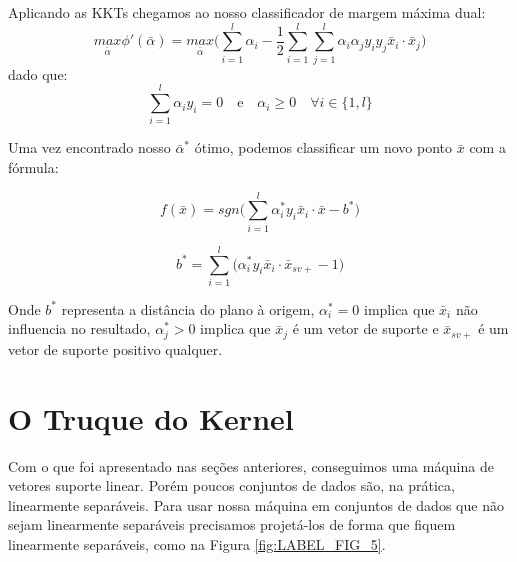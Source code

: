 Aplicando as KKTs chegamos ao nosso classificador de margem máxima dual:
\begin{equation}
    \underset{\bar{\alpha}}{max} \phi' (\bar{\alpha}) = \underset{\bar{\alpha}}{max} \Bigg( \sum_{i=1}^{l}\alpha_i - \frac{1}{2}\sum_{i=1}^{l}\sum_{j=1}^{l}\alpha_i \alpha_j y_i y_j \bar{x}_i\cdot \bar{x}_j \Bigg)
    \label{eq:EQ_Treinador_1}
\end{equation}
dado que:
\begin{equation}
    \sum_{i=1}^{l}\alpha_i y_i = 0 \quad \text{e} \quad \alpha_i \ge 0 \quad \forall  i \in \{1,l\}
    \label{eq:restricoes}
\end{equation}

Uma vez encontrado nosso $\bar{\alpha}^*$ ótimo, podemos classificar um novo ponto $\bar{x}$ com a fórmula:

\begin{equation}
    f(\bar{x}) = sgn\Bigg(
        \sum_{i=1}^{l} \alpha_i^*y_i\bar{x}_i\cdot\bar{x}
        -b^*
    \Bigg)
    \label{eq:EQ_Classificador_1}
\end{equation}

\begin{equation}
    b^* = \sum_{i=1}^{l} 
    \Bigg(
        \alpha_i^*y_i\bar{x}_i\cdot\bar{x}_{sv+} -1
    \Bigg)
    \label{eq:EQ_B_1}
\end{equation}

Onde $b^*$ representa a distância do plano à origem, $\alpha_i^*=0$ implica que $\bar{x}_i$ não influencia no resultado, $\alpha_j^*> 0$ implica que $\bar{x}_j$ é um vetor de suporte e $\bar{x}_{sv+}$ é um vetor de suporte positivo qualquer.


\section{O Truque do Kernel}
Com o que foi apresentado nas seções anteriores, conseguimos uma máquina de vetores suporte linear. Porém poucos conjuntos de dados são, na prática, linearmente separáveis. Para usar nossa máquina em conjuntos de dados que não sejam linearmente separáveis precisamos projetá-los de forma que fiquem linearmente separáveis, como na Figura \ref{fig:LABEL_FIG_5}.

